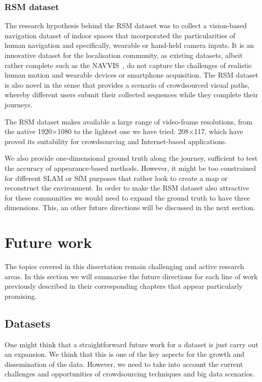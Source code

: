 \subsubsection{RSM dataset}

The research hypothesis behind the RSM dataset was to collect a vision-based navigation dataset of indoor spaces that incorporated the particularities of human navigation and specifically, wearable or hand-held camera inputs. It is an innovative dataset for the localisation community, as existing datasets, albeit rather complete such as the NAVVIS~\cite{Huitl2012}, do not capture the challenges of realistic human motion and wearable devices or smartphone acquisition. The RSM dataset is also novel in the sense that provides a scenario of crowdsourced visual paths, whereby   different users submit their collected sequences while they complete their journeys. 

The RSM dataset makes available a large range of video-frame resolutions, from the native 1920$\times$1080 to the lightest one we have tried: 208$\times$117, which have proved its suitability for crowdsourcing and Internet-based applications.

We also provide one-dimensional ground truth along the journey, sufficient to test the accuracy of appearance-based methods. However, it might be too constrained for different SLAM or SfM purposes that rather look to create a map or reconstruct the environment. In order to make the RSM dataset also attractive for these communities we would need to expand the ground truth to have three dimensions. This, an other future directions will be discussed in the next section.

\section{Future work}
\label{sec:futurework}

The topics covered in this dissertation remain challenging and active research areas. In this section we will summarise the future directions for each line of work previously described in their corresponding chapters that appear particularly promising.

\subsection{Datasets}

One might think that a straightforward future work for a dataset is just carry out an expansion. We think that this is one of the key aspects for the growth and dissemination of the data. However, we need to take into account the current challenges and opportunities of crowdsourcing techniques and big data scenarios.

